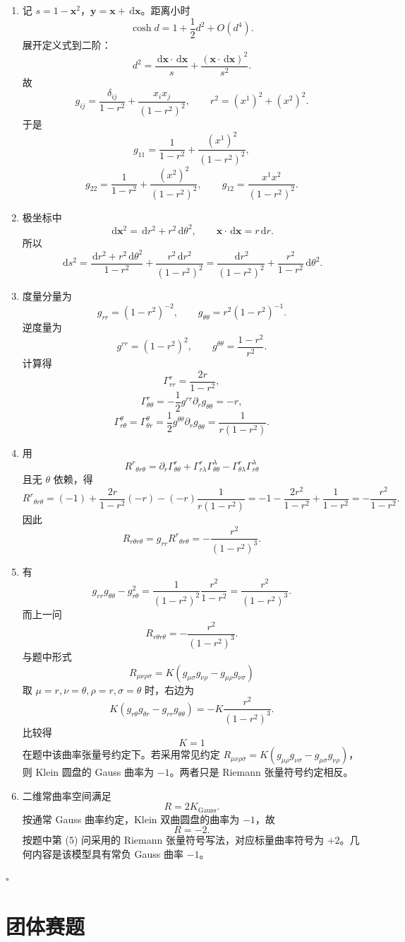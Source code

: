 \documentclass[UTF8,12pt]{ctexart}
\newcommand{\dd}{\,\mathrm d}
\newenvironment{solution}{%
  \par\medskip
  \noindent{\bfseries 解答}\quad\ignorespaces
}{\hfill$\square$\par\medskip}
\begin{document}
\begin{solution}
\begin{enumerate}[label=(\arabic*)]
\item 记 \(s=1-\bm x^2\)，\(\bm y=\bm x+\dd\bm x\)。距离小时
\[
\cosh d=1+\frac12d^2+O(d^4).
\]
展开定义式到二阶：
\[
d^2=\frac{\dd\bm x\cdot\dd\bm x}{s}
+\frac{(\bm x\cdot\dd\bm x)^2}{s^2}.
\]
故
\[
g_{ij}=\frac{\delta_{ij}}{1-r^2}
+\frac{x_ix_j}{(1-r^2)^2},
\qquad r^2=(x^1)^2+(x^2)^2.
\]
于是
\[
g_{11}=\frac1{1-r^2}+\frac{(x^1)^2}{(1-r^2)^2},
\]
\[
g_{22}=\frac1{1-r^2}+\frac{(x^2)^2}{(1-r^2)^2},
\qquad
g_{12}=\frac{x^1x^2}{(1-r^2)^2}.
\]

\item 极坐标中
\[
\dd\bm x^2=\dd r^2+r^2\dd\theta^2,\qquad
\bm x\cdot\dd\bm x=r\dd r.
\]
所以
\[
\dd s^2=\frac{\dd r^2+r^2\dd\theta^2}{1-r^2}
+\frac{r^2\dd r^2}{(1-r^2)^2}
=\frac{\dd r^2}{(1-r^2)^2}
+\frac{r^2}{1-r^2}\dd\theta^2.
\]

\item 度量分量为
\[
g_{rr}=(1-r^2)^{-2},\qquad
g_{\theta\theta}=r^2(1-r^2)^{-1}.
\]
逆度量为
\[
g^{rr}=(1-r^2)^2,\qquad
g^{\theta\theta}=\frac{1-r^2}{r^2}.
\]
计算得
\[
\Gamma^r_{rr}=\frac{2r}{1-r^2},
\]
\[
\Gamma^r_{\theta\theta}
=-\frac12g^{rr}\partial_rg_{\theta\theta}
=-r,
\]
\[
\Gamma^\theta_{r\theta}=\Gamma^\theta_{\theta r}
=\frac12g^{\theta\theta}\partial_rg_{\theta\theta}
=\frac1{r(1-r^2)}.
\]

\item 用
\[
R^r{}_{\theta r\theta}
=\partial_r\Gamma^r_{\theta\theta}
+\Gamma^r_{r\lambda}\Gamma^\lambda_{\theta\theta}
-\Gamma^r_{\theta\lambda}\Gamma^\lambda_{r\theta}
\]
且无 \(\theta\) 依赖，得
\[
R^r{}_{\theta r\theta}
=(-1)+\frac{2r}{1-r^2}(-r)
-(-r)\frac1{r(1-r^2)}
=-1-\frac{2r^2}{1-r^2}+\frac1{1-r^2}
=-\frac{r^2}{1-r^2}.
\]
因此
\[
R_{r\theta r\theta}
=g_{rr}R^r{}_{\theta r\theta}
=-\frac{r^2}{(1-r^2)^3}.
\]

\item 有
\[
g_{rr}g_{\theta\theta}-g_{r\theta}^2
=\frac1{(1-r^2)^2}\frac{r^2}{1-r^2}
=\frac{r^2}{(1-r^2)^3}.
\]
而上一问
\[
R_{r\theta r\theta}
=-\frac{r^2}{(1-r^2)^3}.
\]
与题中形式
\[
R_{\mu\nu\rho\sigma}=K(g_{\mu\sigma}g_{\nu\rho}-g_{\mu\rho}g_{\nu\sigma})
\]
取 \(\mu=r,\nu=\theta,\rho=r,\sigma=\theta\) 时，右边为
\[
K(g_{r\theta}g_{\theta r}-g_{rr}g_{\theta\theta})
=-K\frac{r^2}{(1-r^2)^3}.
\]
比较得
\[
K=1
\]
在题中该曲率张量号约定下。若采用常见约定 \(R_{\mu\nu\rho\sigma}=K(g_{\mu\rho}g_{\nu\sigma}-g_{\mu\sigma}g_{\nu\rho})\)，则 Klein 圆盘的 Gauss 曲率为 \(-1\)。两者只是 Riemann 张量符号约定相反。

\item 二维常曲率空间满足
\[
R=2K_{\mathrm{Gauss}}.
\]
按通常 Gauss 曲率约定，Klein 双曲圆盘的曲率为 \(-1\)，故
\[
R=-2.
\]
按题中第 (5) 问采用的 Riemann 张量符号写法，对应标量曲率符号为 \(+2\)。几何内容是该模型具有常负 Gauss 曲率 \(-1\)。
\end{enumerate}
\end{solution}

\section{团体赛题}
\end{document}
